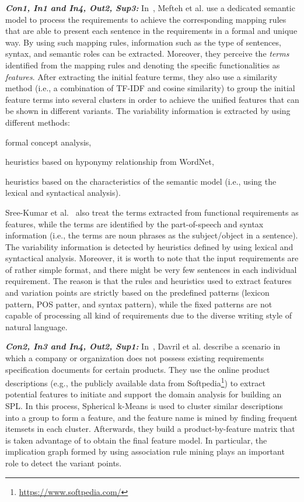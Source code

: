 \documentclass[graybox]{svmult}
\begin{document}
\noindent\textbf{\textit{Con1, In1 and In4, Out2, Sup3:}} In~\cite{MeftehBB16}, Mefteh et al. use a dedicated semantic model to process the requirements to achieve the corresponding mapping rules that are able to present each sentence in the requirements in a formal and unique way. By using such mapping rules, information such as the type of sentences, syntax, and semantic roles can be extracted. 
Moreover, they perceive the \textit{terms} identified from the mapping rules and denoting the specific functionalities as \textit{features}. After extracting the initial feature terms, they also use a similarity method (i.e., a combination of TF-IDF and cosine similarity) to group the initial feature terms into several clusters in order to achieve the unified features that can be shown in different variants. The variability information is extracted by using different methods: 
\begin{inparaenum}
\item formal concept analysis, 
\item heuristics based on hyponymy relationship from WordNet,
\item heuristics based on the characteristics of the semantic model (i.e., using the lexical and syntactical analysis).
\end{inparaenum}

Sree-Kumar et al.~\cite{Sree-KumarPC18} also treat the terms extracted from functional requirements as features, while the terms are identified by the part-of-speech and syntax information (i.e., the terms are noun phrases as the subject/object in a sentence). The variability information is detected by heuristics defined by using lexical and syntactical analysis. 
Moreover, it is worth to note that the input requirements are of rather simple format, and there might be very few sentences in each individual requirement. The reason is that the rules and heuristics used to extract features and variation points are strictly based on the predefined patterns (lexicon pattern, POS patter, and syntax pattern), while the fixed patterns are not capable of processing all kind of requirements due to the diverse writing style of natural language.

\noindent\textbf{\textit{Con2, In3 and In4, Out2, Sup1:}} In~\cite{DavrilDHACH13}, Davril et al. describe a scenario in which a company or organization does not possess existing requirements specification documents for certain products. They use the online product descriptions (e.g., the publicly available data from Softpedia\footnote{\url{https://www.softpedia.com/}}) to extract potential features to initiate and support the domain analysis for building an SPL. In this process, Spherical k-Means is used to cluster similar descriptions into a group to form a feature, and the feature name is mined by finding frequent itemsets in each cluster. Afterwards, they build a product-by-feature matrix that is taken advantage of to obtain the final feature model. In particular, the implication graph formed by using association rule mining plays an important role to detect the variant points.
\end{document}
